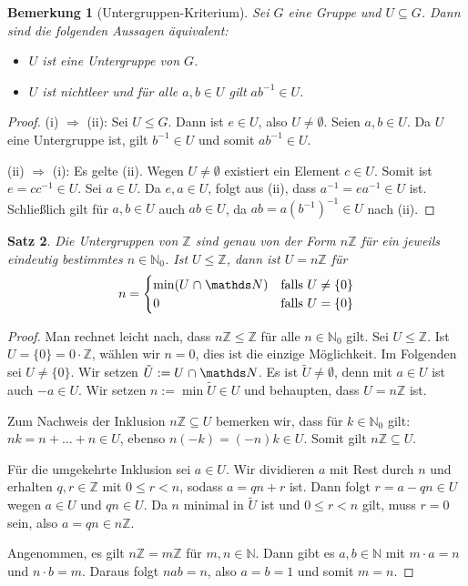 \documentclass[a4paper, twoside, 11pt, ngerman]{report}
\newcommand{\NN}{\mathds N}
\newcommand{\ZZ}{\mathds Z}
\renewcommand{\cap}{\;\rotatebox{90}{\reflectbox{\rotatebox{270}{$\cup$}}}\;}
\theoremstyle{definistyle}
\newtheorem{satz}{Satz}[section]
\newtheorem{bem}[satz]{Bemerkung}
\theoremstyle{remark}
\begin{document}
\begin{bem}[Untergruppen-Kriterium]\label{bem:untergruppen_kriterium}
Sei $G$ eine Gruppe und $U \subseteq G$. Dann sind die folgenden Aussagen äquivalent:
\begin{itemize}
    \item[(i)] $U$ ist eine Untergruppe von $G$.
    \item[(ii)] $U$ ist nichtleer und für alle $a, b \in U$ gilt $ab^{-1} \in U$.
\end{itemize}
\end{bem}


\begin{proof}
(i) $\Rightarrow$ (ii): Sei $U \leq G$. Dann ist $e \in U$, also $U \neq \emptyset$. Seien $a, b \in U$. Da $U$ eine Untergruppe ist, gilt $b^{-1} \in U$ und somit $ab^{-1} \in U$.

(ii) $\Rightarrow$ (i): Es gelte (ii). Wegen $U \neq \emptyset$ existiert ein Element $c\in U$. Somit ist $e = c c^{-1} \in U$. Sei $a \in U$. Da $e, a \in U$, folgt aus (ii), dass $a^{-1} = e a^{-1} \in U$ ist. Schließlich gilt für $a, b \in U$ auch $ab \in U$, da $ab = a (b^{-1})^{-1} \in U$ nach (ii).
\end{proof}

\begin{satz}\label{satz:untergruppen_Z}
Die Untergruppen von $\ZZ$ sind genau von der Form $n\ZZ$ für ein jeweils eindeutig bestimmtes $n \in \NN_0$. Ist $U \leq \ZZ$, dann ist $U = n\ZZ$ für
\[
n = 
\begin{cases}
\min(U \cap \NN) & \text{falls } U \neq \{0\} \\
0 & \text{falls } U = \{0\}
\end{cases}
\]
\end{satz}

\begin{proof}
Man rechnet leicht nach, dass  $n\ZZ \leq \ZZ$ für alle $n \in \NN_0$ gilt. Sei $U \leq \ZZ$.
Ist $U = \{0\}= 0 \cdot \ZZ$, wählen wir $n = 0$, dies ist die einzige Möglichkeit.
Im Folgenden sei $U \neq \{0\}$. Wir setzen $\tilde U := U \cap \NN$. Es ist $\tilde U \neq \emptyset$, denn mit $a \in U$ ist auch $-a \in U$. Wir setzen $n := \min \tilde U \in U$ und behaupten, dass $U = n \ZZ$ ist.

Zum Nachweis der Inklusion $n \ZZ \subseteq U$ bemerken wir, dass für $k \in \NN_0$ gilt: $nk = n + \dots + n \in U$, ebenso $n(-k) = (-n)k \in U$. Somit gilt $n \ZZ \subseteq U$.

Für die umgekehrte Inklusion sei $a \in U$. Wir dividieren $a$ mit Rest durch $n$ und erhalten $q, r \in \ZZ$ mit $0 \leq r < n$, sodass $a = qn + r$ ist. Dann folgt $r = a - qn \in U$ wegen $a \in U$ und $qn \in U$. Da $n$ minimal in $\tilde U$ ist und $0 \leq r < n$ gilt, muss $r = 0$ sein, also $a = qn \in n \ZZ$.

Angenommen, es gilt $n\ZZ = m\ZZ$ für $m, n \in \NN$. Dann gibt es $a, b \in \NN$ mit $m \cdot a = n$ und $n \cdot b = m$. Daraus folgt $nab=n$, also $a = b = 1$ und somit $m = n$.
\end{proof}
\end{document}

